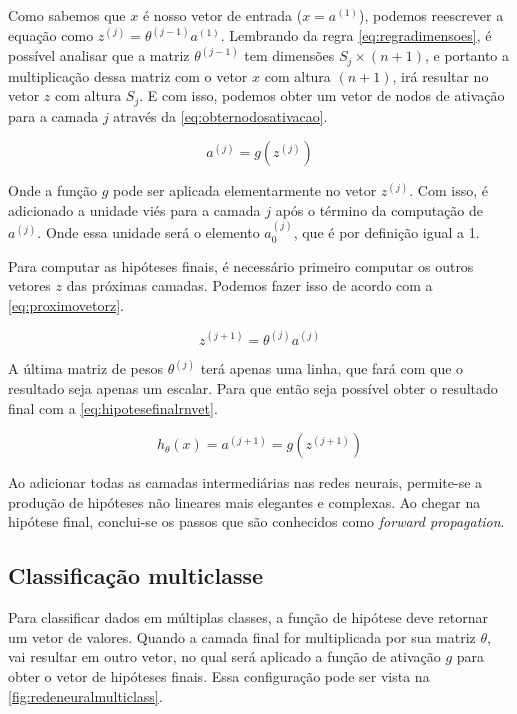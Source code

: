 Como sabemos que $x$ é nosso vetor de entrada ($x = a^{(1)}$), podemos reescrever a equação como $z^{(j)} = \theta^{(j-1)}a^{(1)}$. Lembrando da regra \ref{eq:regradimensoes}, é possível analisar que a matriz  $\theta^{(j-1)}$ tem dimensões $S_j \times (n+1)$, e portanto a multiplicação dessa matriz com o vetor $x$ com altura $(n+1)$, irá resultar no vetor $z$ com altura $S_j$. E com isso, podemos obter um vetor de nodos de ativação para a camada $j$ através da \autoref{eq:obternodosativacao}.

\begin{equation} \label{eq:obternodosativacao}
a^{(j)} = g(z^{(j)}) 
\end{equation}

Onde a função $g$ pode ser aplicada elementarmente no vetor $z^{(j)}$. Com isso, é adicionado a unidade viés para a camada $j$ após o término da computação de $a^{(j)}$. Onde essa unidade será o elemento $a_0^{(j)}$, que é por definição igual a 1.

Para computar as hipóteses finais, é necessário primeiro computar os outros vetores $z$ das próximas camadas. Podemos fazer isso de acordo com a \autoref{eq:proximovetorz}.

\begin{equation} \label{eq:proximovetorz}
z^{(j+1)} =  \theta^{(j)}a^{(j)}
\end{equation}

A última matriz de pesos $\theta^{(j)}$ terá apenas uma linha, que fará com que o resultado seja apenas um escalar. Para que então seja possível obter o resultado final com a \autoref{eq:hipotesefinalrnvet}.

\begin{equation} \label{eq:hipotesefinalrnvet}
h_{\theta}(x) = a^{(j+1)} = g(z^{(j+1)})
\end{equation}

Ao adicionar todas as camadas intermediárias nas redes neurais, permite-se a produção de hipóteses não lineares mais elegantes e complexas. Ao chegar na hipótese final, conclui-se os passos que são conhecidos como \textit{forward propagation}.


\subsection{Classificação multiclasse}\label{subsec:clasmultirn}

Para classificar dados em múltiplas classes, a função de hipótese deve retornar um vetor de valores. Quando a camada final for multiplicada por sua matriz $\theta$, vai resultar em outro vetor, no qual será aplicado a função de ativação $g$ para obter o vetor de hipóteses finais. Essa configuração pode ser vista na \autoref{fig:redeneuralmulticlass}.


